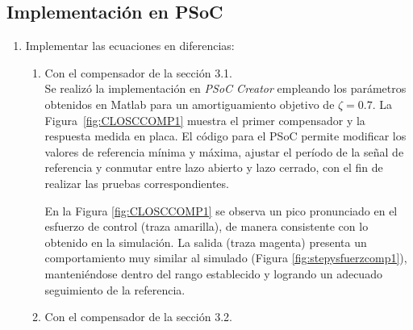 \newpage
\onecolumn

\subsection{Implementación en PSoC}
	\vspace{-2em}

\begin{enumerate}[label=4.\arabic*.]
	\item Implementar las ecuaciones en diferencias:

	\begin{enumerate}[label*=4.\arabic*.]
			\item Con el compensador de la sección 3.1.\\
			Se realizó la implementación en \textit{PSoC Creator} empleando los parámetros obtenidos en Matlab para un amortiguamiento objetivo de $\zeta = 0.7$. La Figura~\ref{fig:CLOSCCOMP1} muestra el primer compensador y la respuesta medida en placa.
			El código para el PSoC permite modificar los valores de referencia mínima y máxima, ajustar el período de la señal de referencia y conmutar entre lazo abierto y lazo cerrado, con el fin de realizar las pruebas correspondientes.
			
			
			En la Figura \ref{fig:CLOSCCOMP1} se observa un pico pronunciado en el esfuerzo de control (traza amarilla), de manera consistente con lo obtenido en la simulación. La salida (traza magenta) presenta un comportamiento muy similar al simulado (Figura \ref{fig:stepysfuerzcomp1}), manteniéndose dentro del rango establecido y logrando un adecuado seguimiento de la referencia.
			
			
			
			
			
			\item Con el compensador de la sección 3.2.
			

\end{enumerate}
\end{enumerate}
